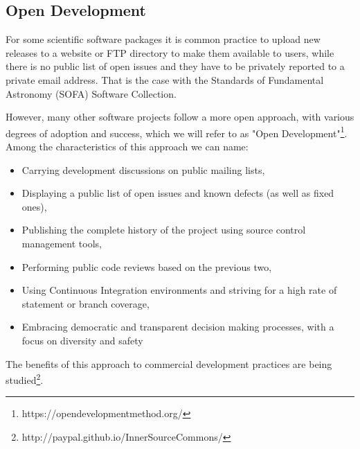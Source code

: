 \subsection{Open Development}

For some scientific software packages it is common practice to upload new releases to a website or FTP directory to make them available to users, while there is no public list of open issues and they have to be privately reported to a private email address. That is the case with the Standards of Fundamental Astronomy (SOFA) Software Collection.

However, many other software projects follow a more open approach, with various degrees of adoption and success, which we will refer to as "Open Development"\footnote{https://opendevelopmentmethod.org/}. Among the characteristics of this approach we can name:

\begin{itemize}
\item Carrying development discussions on public mailing lists,
\item Displaying a public list of open issues and known defects (as well as fixed ones),
\item Publishing the complete history of the project using source control management tools,
\item Performing public code reviews based on the previous two,
\item Using Continuous Integration environments and striving for a high rate of statement or branch coverage,
\item Embracing democratic and transparent decision making processes, with a focus on diversity and safety
\end{itemize}

The benefits of this approach to commercial development practices are being studied\footnote{http://paypal.github.io/InnerSourceCommons/}.
